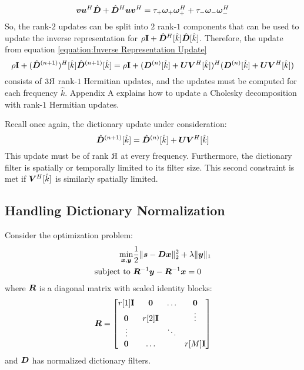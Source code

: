 \begin{equation}
\bm{v}\bm{u}^H\hat{\bm{D}} + \hat{\bm{D}}^H\bm{u}\bm{v}^H = \tau_+\bm{\omega}_+\bm{\omega}_+^H + \tau_-\bm{\omega}_-\bm{\omega}_-^H
\end{equation}
So, the rank-$2$ updates can be split into $2$ rank-$1$ components that can be used to update the inverse representation for $\rho{\bf I} + \hat{\bm{D}}^H[\hat{k}]\hat{\bm{D}}[\hat{k}]$.
Therefore, the update from equation \ref{equation:Inverse Representation Update}
\begin{equation}
\rho{\bf I} + (\hat{\bm{D}}^{(n + 1)})^H[\hat{k}]\hat{\bm{D}}^{(n + 1)}[\hat{k}] = \rho{\bf I} + (\bm{D}^{(n)}[\hat{k}] + \bm{U}\bm{V}^H[\hat{k}])^H(\bm{D}^{(n)}[\hat{k}] + \bm{U}\bm{V}^H[\hat{k}])
\end{equation}
consists of $3\reflectbox{R}$ rank-$1$ Hermitian updates, and the updates must be computed for each frequency $\hat{k}$. Appendix A explains how to update a Cholesky decomposition with rank-$1$ Hermitian updates.

Recall once again, the dictionary update under consideration:
\begin{equation}
\hat{\bm{D}}^{(n + 1)}[\hat{k}] = \hat{\bm{D}}^{(n)}[\hat{k}] + \bm{U}\bm{V}^H[\hat{k}]
\end{equation}
%
This update must be of rank $\reflectbox{R}$ at every frequency. Furthermore, the dictionary filter is spatially or temporally limited to its filter size. This second constraint is met if $\bm{V}^H[\hat{k}]$ is similarly spatially limited.

\subsection{Handling Dictionary Normalization}
Consider the optimization problem:
%
\begin{equation}
\begin{aligned}
\min_{\bm{x},\bm{y}} & \frac{1}{2}\|\bm{s} -\bm{D}\bm{x}\|_2^2 + \lambda\|\bm{y}\|_1 \\
\text{subject to } & \bm{R}^{-1}\bm{y} - \bm{R}^{-1}\bm{x} = 0 
\end{aligned}
\end{equation}
%
where $\bm{R}$ is a diagonal matrix with scaled identity blocks:
%
\begin{equation}
\bm{R} = \begin{bmatrix} r[1]{\bf I} & \bm{0} & \hdots & \bm{0} \\ \bm{0} & r[2]{\bf I} &  & \vdots \\ \vdots &  & \ddots &   \\ \bm{0} & \hdots &  & r[M]{\bf I} \end{bmatrix}
\end{equation}
%
and $\bm{D}$ has normalized dictionary filters.

